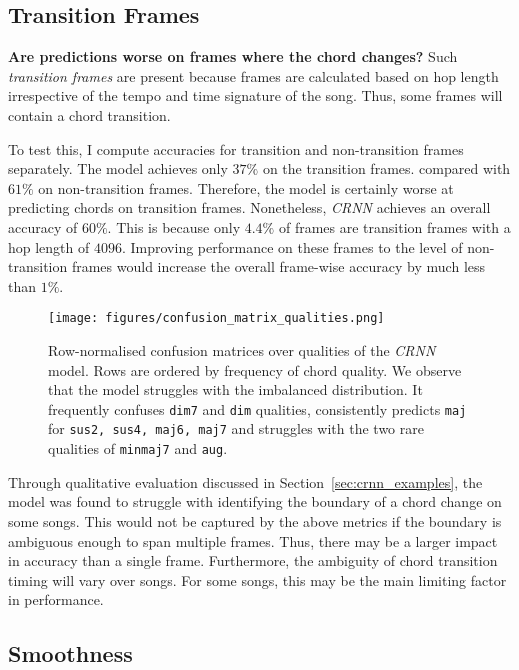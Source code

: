 \subsection{Transition Frames}\label{sec:transition_frames}

\textbf{Are predictions worse on frames where the chord changes?} Such \emph{transition frames} are present because frames are calculated based on hop length irrespective of the tempo and time signature of the song. Thus, some frames will contain a chord transition. 

To test this, I compute accuracies for transition and non-transition frames separately. The model achieves only $37\%$ on the transition frames. compared with $61\%$ on non-transition frames. Therefore, the model is certainly worse at predicting chords on transition frames. Nonetheless, \emph{CRNN} achieves an overall accuracy of $60\%$. This is because only $4.4\%$ of frames are transition frames with a hop length of $4096$. Improving performance on these frames to the level of non-transition frames would increase the overall frame-wise accuracy by much less than $1\%$. 

\begin{figure}[H]
    \centering
    \texttt{[image: figures/confusion\_matrix\_qualities.png]}
    \caption{Row-normalised confusion matrices over qualities of the \emph{CRNN} model. Rows are ordered by frequency of chord quality. We observe that the model struggles with the imbalanced distribution. It frequently confuses \texttt{dim7} and \texttt{dim} qualities, consistently predicts \texttt{maj} for \texttt{sus2, sus4, maj6, maj7} and struggles with the two rare qualities of \texttt{minmaj7} and \texttt{aug}.}\label{fig:crnn_qual_cm}
\end{figure}

Through qualitative evaluation discussed in Section~\ref{sec:crnn_examples}, the model was found to struggle with identifying the boundary of a chord change on some songs. This would not be captured by the above metrics if the boundary is ambiguous enough to span multiple frames. Thus, there may be a larger impact in accuracy than a single frame. Furthermore, the ambiguity of chord transition timing will vary over songs. For some songs, this may be the main limiting factor in performance.

\subsection{Smoothness}\label{sec:smoothness}


